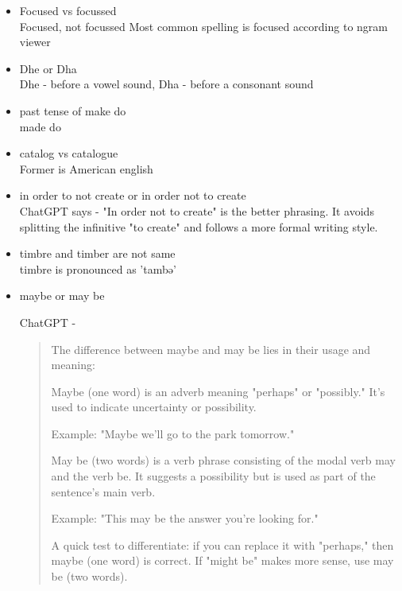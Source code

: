 \documentclass{../template/texnote}
\begin{document}
\begin{itemize}
 \item Focused vs focussed \\
Focused, not focussed
Most common spelling is focused according to ngram viewer

\item Dhe or Dha \\
Dhe - before a vowel sound, Dha - before a consonant sound

\item past tense of make do \\
made do

\item catalog vs catalogue \\
Former is American english

\item in order to not create
 or
 in order not to create \\
 ChatGPT says - 
"In order not to create" is the better phrasing. It avoids splitting the infinitive "to create" and follows a more formal writing style.

\item timbre and timber are not same \\
timbre is pronounced as 'tambə'

\item maybe or may be 

	ChatGPT -
\begin{quote}
	The difference between maybe and may be lies in their usage and meaning:

Maybe (one word) is an adverb meaning "perhaps" or "possibly." It’s used to indicate uncertainty or possibility.

Example: "Maybe we'll go to the park tomorrow."

May be (two words) is a verb phrase consisting of the modal verb may and the verb be. It suggests a possibility but is used as part of the sentence’s main verb.

Example: "This may be the answer you're looking for."

A quick test to differentiate: if you can replace it with "perhaps," then maybe (one word) is correct. If "might be" makes more sense, use may be (two words).
\end{quote}
	\end{itemize}
    \printbibliography
\end{document}
